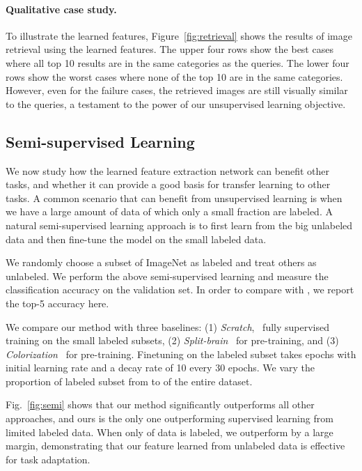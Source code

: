 \vspace{-11pt}
\paragraph{Qualitative case study.}
To illustrate the learned features,
Figure~\ref{fig:retrieval} shows the results of image retrieval using the learned
features.
The upper four rows show the best cases where all top 10 results
are in the same categories as the queries.
The lower four rows show the worst cases where none of the top 10
are in the same categories. However, even for the failure cases, the retrieved images are still visually similar to the queries, a testament to the power of our unsupervised learning objective.

\subsection{Semi-supervised Learning}

We now study how the learned feature extraction network can benefit other tasks, and whether it can provide a good basis for transfer learning to other tasks.
A common scenario that can benefit from unsupervised learning is when we have a large amount of data of which only a small fraction are labeled.
A natural semi-supervised learning approach is to first learn from the big unlabeled data and then fine-tune the model
on the small labeled data.

We randomly choose a subset of ImageNet as
labeled and treat others as unlabeled.
We perform the above semi-supervised learning and measure the classification accuracy on the validation set.
In order to compare with \cite{larsson2017colorization}, we report the top-5 accuracy here.

We compare our method with three baselines:
(1) \emph{Scratch}, \ie~fully supervised training on the small labeled subsets,
(2) \emph{Split-brain}~\cite{zhang2017split} for pre-training,
and (3) \emph{Colorization}~\cite{larsson2017colorization} for pre-training.
Finetuning on the labeled subset takes  epochs with initial learning
rate  and a decay rate of 10 every 30 epochs.
We vary the proportion of labeled subset 
from  to  of the entire dataset.

Fig.~\ref{fig:semi} shows
that our method significantly outperforms all other approaches, and ours is the only one outperforming supervised learning from limited labeled data.
When only  of data is labeled, we outperform by a large  margin,
demonstrating that our feature learned
from unlabeled data is effective for task adaptation.



